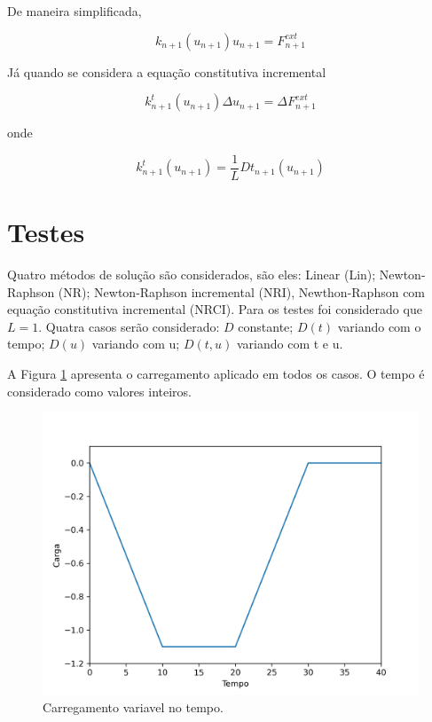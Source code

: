\documentclass[12pt,a4paper]{article}
\begin{document}
De maneira simplificada, 

\begin{equation}
k_{n+1}(u_{n+1}) u_{n+1} = F^{ext}_{n+1}
\end{equation}

Já quando se considera a equação constitutiva incremental

\begin{equation}
k^t_{n+1}(u_{n+1}) \Delta u_{n+1} = \Delta F^{ext}_{n+1}
\end{equation}

\noindent
onde

\begin{equation}
k^t_{n+1}(u_{n+1}) = \frac{1}{L} Dt_{n+1}\left(u_{n+1}\right)
\end{equation}


\section{Testes}

Quatro métodos de solução são considerados, são eles: Linear (Lin); Newton-Raphson (NR); Newton-Raphson incremental (NRI), Newthon-Raphson com equação constitutiva incremental (NRCI). Para os testes foi considerado que $L = 1$. Quatra casos serão considerado: $D$ constante; $D(t)$ variando com o tempo; $D(u)$ variando com u; $D(t, u)$ variando com t e u.  


A Figura \ref{fig:forcas} apresenta o carregamento aplicado em todos os casos. O tempo é considerado como valores inteiros. 

\begin{figure}[H]
	\centering
	\includegraphics[width=1.0\textwidth]{forces.PNG}
	\caption{Carregamento variavel no tempo.}
	\label{fig:forcas}
\end{figure}
\end{document}

